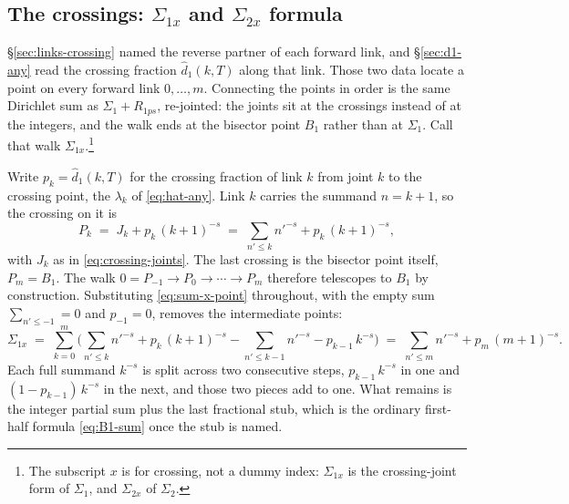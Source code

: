 \documentclass[11pt]{article}
\theoremstyle{definition}
\begin{document}
\subsection{The crossings: \texorpdfstring{$\Sigma_{1x}$ and $\Sigma_{2x}$}{Sigma\_1x and Sigma\_2x} formula}\label{sec:sum-x}

\S\ref{sec:links-crossing} named the reverse partner of each forward link, and
\S\ref{sec:d1-any} read the crossing fraction \(\hat d_1(k,T)\) along that
link. Those two data locate a point on every forward link \(0,\dots,m\).
Connecting the points in order is the same Dirichlet sum as
\(\Sigma_1+R_{1ps}\), re-jointed: the joints sit at the crossings instead of
at the integers, and the walk ends at the bisector point \(B_1\) rather than
at \(\Sigma_1\). Call that walk \(\Sigma_{1x}\).\footnote{The subscript \(x\) is for crossing, not a dummy index: \(\Sigma_{1x}\) is the crossing-joint form of \(\Sigma_1\), and \(\Sigma_{2x}\) of \(\Sigma_2\).}

Write \(p_k=\hat d_1(k,T)\) for the crossing fraction of link \(k\) from joint
\(k\) to the crossing point, the \(\lambda_k\) of \eqref{eq:hat-any}. Link \(k\) carries the
summand \(n=k+1\), so the crossing on it is
\begin{equation}\label{eq:sum-x-point}
P_k
\;=\;
J_k+p_k\,(k+1)^{-s}
\;=\;
\sum_{n'\le k}n'^{-s}+p_k\,(k+1)^{-s},
\end{equation}
with \(J_k\) as in \eqref{eq:crossing-joints}. The last crossing is the
bisector point itself, \(P_m=B_1\). The walk
\(0=P_{-1}\to P_0\to\cdots\to P_m\) therefore telescopes to \(B_1\) by
construction. Substituting \eqref{eq:sum-x-point} throughout, with the empty
sum \(\sum_{n'\le-1}=0\) and \(p_{-1}=0\), removes the intermediate points:
\begin{equation}\label{eq:sum-1x}
\Sigma_{1x}
\;=\;
\sum_{k=0}^{m}\Biggl(
\sum_{n'\le k}n'^{-s}+p_k\,(k+1)^{-s}
-\sum_{n'\le k-1}n'^{-s}-p_{k-1}\,k^{-s}
\Biggr)
\;=\;
\sum_{n'\le m}n'^{-s}+p_m\,(m+1)^{-s}.
\end{equation}
Each full summand \(k^{-s}\) is split across two consecutive steps,
\(p_{k-1}\,k^{-s}\) in one and \((1-p_{k-1})\,k^{-s}\) in the next, and those
two pieces add to one. What remains is the integer partial sum plus the last
fractional stub, which is the ordinary first-half formula
\eqref{eq:B1-sum} once the stub is named.
\end{document}
